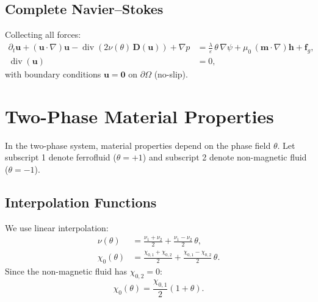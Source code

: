 \documentclass[11pt,a4paper]{article}
\theoremstyle{definition}
\theoremstyle{remark}
\newcommand{\dt}{\partial_t}
\newcommand{\dv}{\operatorname{div}}
\newcommand{\grad}{\nabla}
\newcommand{\eps}{\varepsilon}
\newcommand{\bfu}{\bm{u}}
\newcommand{\bfm}{\bm{m}}
\newcommand{\bfh}{\bm{h}}
\newcommand{\bff}{\bm{f}}
\begin{document}
\subsection{Complete Navier--Stokes}

Collecting all forces:
\begin{equation}
  \label{eq:NS-complete}
  \boxed{
  \begin{aligned}
    \dt\bfu + (\bfu \cdot \grad)\bfu
    - \dv\!\left(2\nu(\theta)\,\bm{D}(\bfu)\right)
    + \grad p
    &= \frac{\lambda}{\eps}\,\theta\,\grad\psi
       + \mu_0\,(\bfm \cdot \grad)\bfh
       + \bff_g, \\
    \dv(\bfu) &= 0,
  \end{aligned}
  }
\end{equation}
with boundary conditions $\bfu = \bm{0}$ on $\partial\Omega$ (no-slip).


\section{Two-Phase Material Properties}
\label{sec:two-phase}

In the two-phase system, material properties depend on the phase field
$\theta$. Let subscript 1 denote ferrofluid ($\theta = +1$) and
subscript 2 denote non-magnetic fluid ($\theta = -1$).

\subsection{Interpolation Functions}

We use linear interpolation:
\begin{equation}
  \label{eq:interp}
  \begin{aligned}
    \nu(\theta) &= \frac{\nu_1 + \nu_2}{2}
                 + \frac{\nu_1 - \nu_2}{2}\,\theta, \\
    \chi_0(\theta) &= \frac{\chi_{0,1} + \chi_{0,2}}{2}
                    + \frac{\chi_{0,1} - \chi_{0,2}}{2}\,\theta.
  \end{aligned}
\end{equation}
Since the non-magnetic fluid has $\chi_{0,2} = 0$:
\begin{equation}
  \label{eq:chi-interp}
  \chi_0(\theta) = \frac{\chi_{0,1}}{2}(1 + \theta).
\end{equation}
\end{document}
